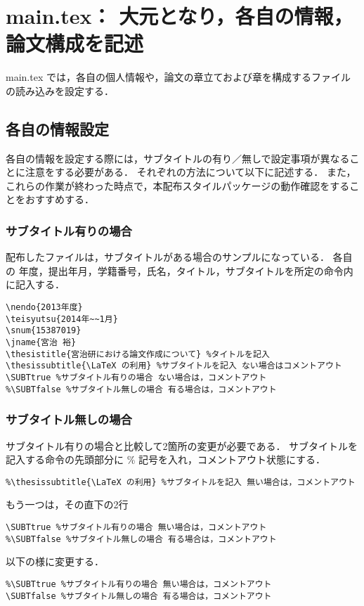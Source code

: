 \section{main.tex： 大元となり，各自の情報，論文構成を記述}
main.tex では，各自の個人情報や，論文の章立ておよび章を構成するファイルの読み込みを設定する．

\subsection{各自の情報設定}
各自の情報を設定する際には，サブタイトルの有り／無しで設定事項が異なることに注意をする必要がある．
それぞれの方法について以下に記述する．
また，これらの作業が終わった時点で，本配布スタイルパッケージの動作確認をすることをおすすめする．

\subsubsection{サブタイトル有りの場合}
配布したファイルは，サブタイトルがある場合のサンプルになっている．
各自の 年度，提出年月，学籍番号，氏名，タイトル，サブタイトルを所定の命令内に記入する．
\begin{breakbox}
{\small
\begin{verbatim}
\nendo{2013年度}
\teisyutsu{2014年~~1月}
\snum{15387019}
\jname{宮治 裕}
\thesistitle{宮治研における論文作成について} %タイトルを記入
\thesissubtitle{\LaTeX の利用} %サブタイトルを記入 ない場合はコメントアウト
\SUBTtrue %サブタイトル有りの場合 ない場合は，コメントアウト
%\SUBTfalse %サブタイトル無しの場合 有る場合は，コメントアウト
\end{verbatim}
}
\end{breakbox}

\subsubsection{サブタイトル無しの場合}
サブタイトル有りの場合と比較して2箇所の変更が必要である．
サブタイトルを記入する命令の先頭部分に \% 記号を入れ，コメントアウト状態にする．

\begin{breakbox}
{\small
\begin{verbatim}
%\thesissubtitle{\LaTeX の利用} %サブタイトルを記入 無い場合は，コメントアウト
\end{verbatim}
}
\end{breakbox}
もう一つは，その直下の2行
\begin{breakbox}
{\small
\begin{verbatim}
\SUBTtrue %サブタイトル有りの場合 無い場合は，コメントアウト
%\SUBTfalse %サブタイトル無しの場合 有る場合は，コメントアウト
\end{verbatim}
}
\end{breakbox}
以下の様に変更する．
\begin{breakbox}
{\small
\begin{verbatim}
%\SUBTtrue %サブタイトル有りの場合 無い場合は，コメントアウト
\SUBTfalse %サブタイトル無しの場合 有る場合は，コメントアウト
\end{verbatim}
}
\end{breakbox}

